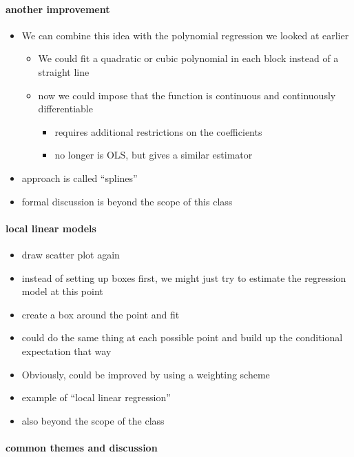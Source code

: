 \paragraph{another improvement}
\label{sec-1-3-1-4}

\begin{itemize}
\item We can combine this idea with the polynomial regression we
         looked at earlier
\begin{itemize}
\item We could fit a quadratic or cubic polynomial in each block
           instead of a straight line
\item now we could impose that the function is continuous and
           continuously differentiable
\begin{itemize}
\item requires additional restrictions on the coefficients
\item no longer is OLS, but gives a similar estimator
\end{itemize}
\end{itemize}
\item approach is called ``splines''
\item formal discussion is beyond the scope of this class
\end{itemize}
\paragraph{local linear models}
\label{sec-1-3-2}

\begin{itemize}
\item draw scatter plot again
\item instead of setting up boxes first, we might just try to
        estimate the regression model at this point
\item create a box around the point and fit
\item could do the same thing at each possible point and build up
        the conditional expectation that way
\item Obviously, could be improved by using a weighting scheme
\item example of ``local linear regression''
\item also beyond the scope of the class
\end{itemize}
\paragraph{common themes and discussion}
\label{sec-1-3-3}

